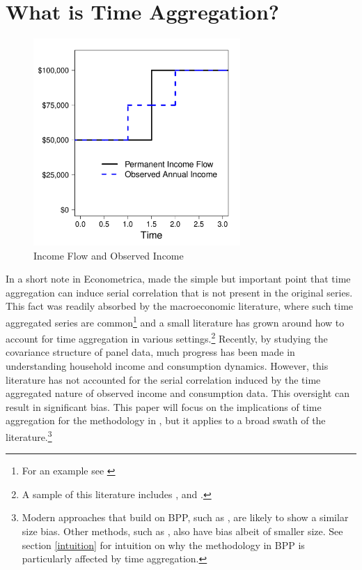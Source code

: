 \documentclass[AER]{AEA}
\begin{document}
\section{What is Time Aggregation?}
\begin{figure}
	\includegraphics[width=0.7\textwidth]{../Code/Figures/TimeAggAER_simple.pdf}
	\caption{Income Flow and Observed Income}
	\label{fig:TimeAggExample}
\end{figure}
In a short note in Econometrica, \cite{working_note_1960} made the simple but important point that time aggregation can induce serial correlation that is not present in the original series. This fact was readily absorbed by the macroeconomic literature, where such time aggregated series are common\footnote{For an example see \cite{campbell_consumption_1989}} and a small literature has grown around how to account for time aggregation in various settings.\footnote{A sample of this literature includes \cite{amemiya_effect_1972}, \cite{weiss_systematic_1984} and \cite{drost_temporal_1993}.} Recently, by studying the covariance structure of panel data, much progress has been made in understanding household income and consumption dynamics. However, this literature has not accounted for the serial correlation induced by the time aggregated nature of observed income and consumption data. This oversight can result in significant bias. This paper will focus on the implications of time aggregation for the methodology in \cite{blundell_consumption_2008}, but it applies to a broad swath of the literature.\footnote{Modern approaches that build on BPP, such as \cite{arellano_earnings_2017}, are likely to show a similar size bias. Other methods, such as \cite{carroll_nature_1997}, also have bias albeit of smaller size. See section \ref{intuition} for intuition on why the methodology in BPP is particularly affected by time aggregation.}
\end{document}
